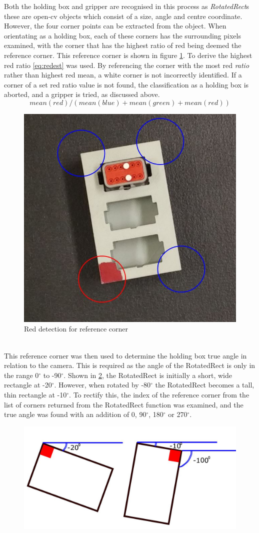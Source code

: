 \documentclass[11pt,a4paper, margin=1in]{report}
\begin{document}
Both the holding box and gripper are recognised in this process as \mbox{\textit{RotatedRect}s} these are open-cv objects which consist of a size, angle and centre coordinate. However, the four corner points can be extracted from the object. When orientating as a holding box, each of these corners has the surrounding pixels examined, with the corner that has the highest ratio of red being deemed the reference corner. This reference corner is shown in figure \cref{fig:Redest}. To derive the highest red ratio \cref{eq:redest} was used. By referencing the corner with the most red \textit{ratio} rather than highest red mean, a white corner is not incorrectly identified. If a corner of a set red ratio value is not found, the classification as a holding box is aborted, and a gripper is tried, as discussed above.
\begin{equation}
mean(red)/(mean(blue)+mean(green)+mean(red))
\label{eq:redest}
\end{equation}
\begin{figure}[h]
	\centering
	\includegraphics[width=0.3\linewidth]{Redest}
	\caption{Red detection for reference corner}
	\label{fig:Redest}\end{figure}\\

This reference corner was then used to determine the holding box true angle in relation to the camera. This is required as the angle of the RotatedRect is only in the range 0$^{\circ}$ to -90$^{\circ}$. Shown in  \cref{fig:angleissue}, the RotatedRect is initially a short, wide rectangle at -20$^{\circ}$. However, when rotated by -80$^{\circ}$ the RotatedRect becomes a tall, thin rectangle at -10$^{\circ}$. To rectify this, the index of the reference corner from the list of corners returned from the RotatedRect function was examined, and the true angle was found with an addition of 0, 90$^{\circ}$, 180$^{\circ}$ or 270$^{\circ}$. 

\begin{figure}[h]
\centering
\includegraphics[width=0.7\linewidth]{"angle_issue"}
\caption{}
\label{fig:angleissue}
\end{figure}
\end{document}

